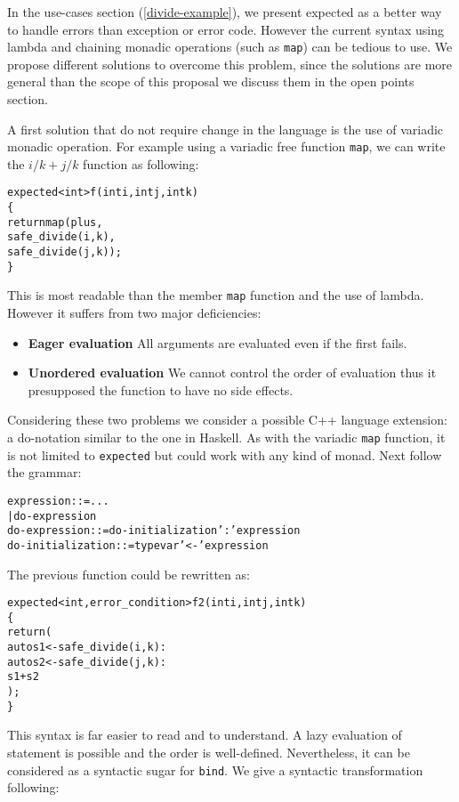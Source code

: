 \documentclass[a4paper,10pt]{article}
\newcommand{\cpp}[1]{\lstinline{#1}}
\begin{document}
In the use-cases section (\ref{divide-example}), we present expected as a better way to handle errors than exception or error code. However the current syntax using lambda and chaining monadic operations (such as \cpp{map}) can be tedious to use. We propose different solutions to overcome this problem, since the solutions are more general than the scope of this proposal we discuss them in the open points section.

A first solution that do not require change in the language is the use of variadic monadic operation. For example using a variadic free function \cpp{map}, we can write the $i/k + j/k$ function as following:

\begin{alltt}
expected<int> f(int i, int j, int k)
\{
  return map(plus,
    safe_divide(i, k), 
    safe_divide(j, k));
\}
\end{alltt}

This is most readable than the member \cpp{map} function and the use of lambda. However it suffers from two major deficiencies:

\begin{itemize}
\item \textbf{Eager evaluation} All arguments are evaluated even if the first fails.
\item \textbf{Unordered evaluation} We cannot control the order of evaluation thus it presupposed the function to have no side effects.
\end{itemize}

Considering these two problems we consider a possible C++ language extension: a do-notation similar to the one in Haskell. As with the variadic \cpp{map} function, it is not limited to \cpp{expected} but could work with any kind of monad. Next follow the grammar:

\begin{alltt}
expression ::= ...
            | do-expression
do-expression ::= do-initialization ':' expression
do-initialization ::= type var '<-' expression
\end{alltt}

\noindent
The previous function could be rewritten as:

\begin{alltt}
expected<int, error_condition> f2(int i, int j, int k)
\{
  return (
    auto s1 <- safe_divide(i, k) :
    auto s2 <- safe_divide(j, k) :
    s1 + s2
  );
\}
\end{alltt}

This syntax is far easier to read and to understand. A lazy evaluation of statement is possible and the order is well-defined. Nevertheless, it can be considered as a syntactic sugar for \cpp{bind}. We give a syntactic transformation following:
\end{document}
